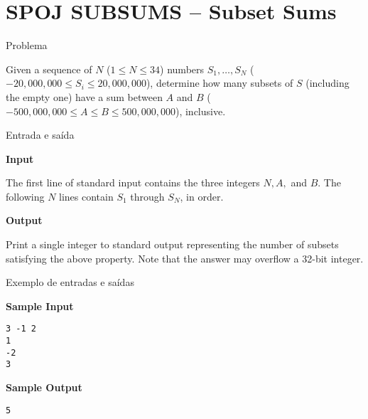 \section{SPOJ SUBSUMS -- Subset Sums}

\begin{frame}[fragile]{Problema}

Given a sequence of $N$ ($1\leq N\leq 34$) numbers $S_1, \ldots, S_N$ 
($-20,000,000\leq S_i\leq 20,000,000$), determine how many subsets of $S$ (including the empty 
one) have a sum between $A$ and $B$ ($-500,000,000\leq A\leq B\leq 500,000,000$), inclusive.

\end{frame}

\begin{frame}[fragile]{Entrada e saída}

\textbf{Input}

The first line of standard input contains the three integers $N, A,$ and $B$. The following $N$
lines contain $S_1$ through $S_N$, in order.

\textbf{Output}

Print a single integer to standard output representing the number of subsets satisfying the above property. Note that the answer may overflow a 32-bit integer.

\end{frame}

\begin{frame}[fragile]{Exemplo de entradas e saídas}

\begin{minipage}[t]{0.45\textwidth}
\textbf{Sample Input}
\begin{verbatim}
3 -1 2
1
-2
3
\end{verbatim}
\end{minipage}
\begin{minipage}[t]{0.5\textwidth}
\textbf{Sample Output}
\begin{verbatim}
5
\end{verbatim}
\end{minipage}
\end{frame}


